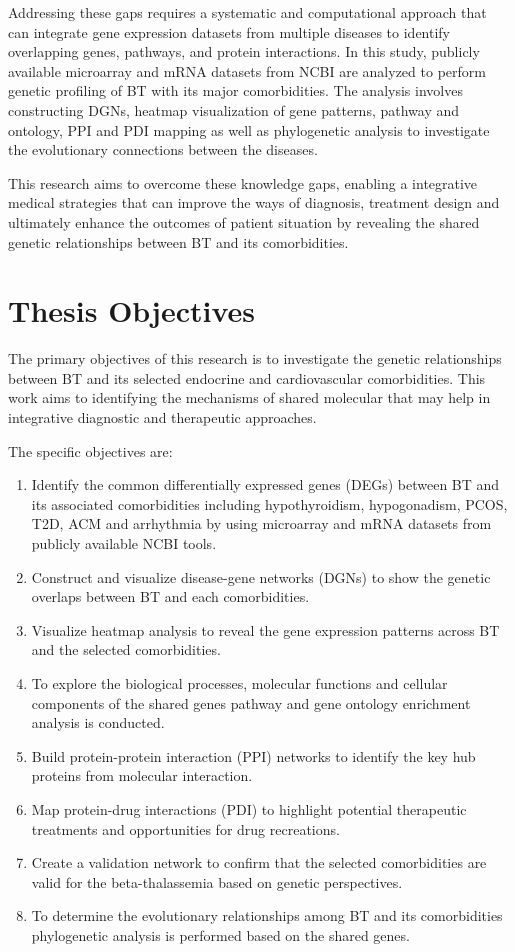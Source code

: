Addressing these gaps requires a systematic and computational approach that can integrate gene expression datasets from multiple diseases to identify overlapping genes, pathways, and protein interactions. In this study, publicly available microarray and mRNA datasets from NCBI are analyzed to perform genetic profiling of BT with its major comorbidities. The analysis involves constructing DGNs, heatmap visualization of gene patterns, pathway and ontology, PPI and PDI mapping as well as phylogenetic analysis to investigate the evolutionary connections between the diseases.

This research aims to overcome these knowledge gaps, enabling a integrative medical strategies that can improve the ways of diagnosis, treatment design and ultimately enhance the outcomes of patient situation by revealing the shared genetic relationships between BT and its comorbidities.


\section{Thesis Objectives}
\label{sec:sec01}

The primary objectives of this research is to investigate the genetic relationships between BT and its selected endocrine and cardiovascular comorbidities. This work aims to identifying the mechanisms of shared molecular that may help in integrative diagnostic and therapeutic approaches.

The specific objectives are:


\begin{enumerate}[label=\arabic*)]
\item Identify the common differentially expressed genes (DEGs) between BT and its associated comorbidities including hypothyroidism, hypogonadism, PCOS, T2D, ACM and arrhythmia by using microarray and mRNA datasets from publicly available NCBI tools.
\item Construct and visualize disease-gene networks (DGNs) to show the genetic overlaps between BT and each comorbidities.
\item Visualize heatmap analysis to reveal the gene expression patterns across BT and the selected comorbidities.
\item To explore the biological processes, molecular functions and cellular components of the shared genes pathway and gene ontology enrichment analysis is conducted.
\item Build protein-protein interaction (PPI) networks to identify the key hub proteins from molecular interaction.
\item Map protein-drug interactions (PDI) to highlight potential therapeutic treatments and opportunities for drug recreations.
\item Create a validation network to confirm that the selected comorbidities are valid for the beta-thalassemia based on genetic perspectives.
\item To determine the evolutionary relationships among BT and its comorbidities phylogenetic analysis is performed based on the shared genes.
\end{enumerate}


